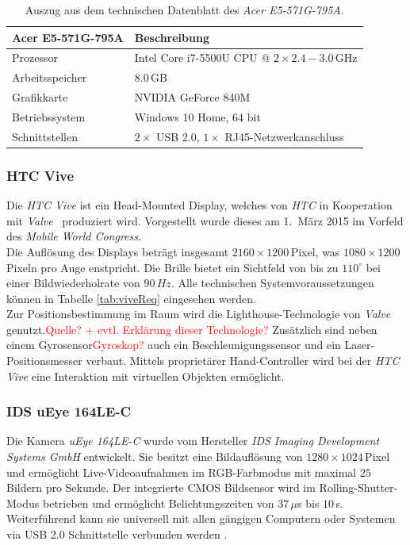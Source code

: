 \begin{table}
	\centering
	\begin{tabular}{|l|l|}
		\hline
		\Absatzbox{}
		\textbf{Acer E5-571G-795A}& \textbf{Beschreibung} \\
		\hline
		Prozessor & Intel Core i7-5500U CPU @ $2\times 2.4-3.0\,$GHz\\
		\hline
		Arbeitsspeicher & $8.0\,$GB \\
		\hline 
		Grafikkarte & NVIDIA GeForce 840M\\
		\hline
		Betriebssystem & Windows 10 Home, 64 bit \\
		\hline
		Schnittstellen & $2\times$ USB 2.0, $1\times$ RJ45-Netzwerkanschluss\\
		\hline
	\end{tabular}
	\caption{Auszug aus dem technischen Datenblatt des \textit{Acer E5-571G-795A}.}
	\label{tab:TrackingCompParam}
\end{table}


\subsubsection{HTC Vive}\label{sec:Vive} 
Die \textit{HTC Vive} ist ein Head-Mounted Display, welches von \textit{HTC} in Kooperation mit \textit{Valve}~\cite{website:Valve} produziert wird. Vorgestellt wurde dieses am 1.\ März 2015 im Vorfeld des \textit{Mobile World Congress}.~\cite{website:mobileworldcongress}\\
Die Auflösung des Displays beträgt insgesamt $2160\times1200$\,Pixel, was $1080\times1200$\,Pixeln pro Auge enstpricht. Die Brille bietet ein Sichtfeld von bis zu $110^\circ$ bei einer Bildwiederholrate von $90\,Hz$.\cite{website:HTC_Vive} Alle technischen Systemvoraussetzungen können in Tabelle \ref{tab:viveReq} eingesehen werden. \\
Zur Positionsbestimmung im Raum wird die Lighthouse-Technologie von \textit{Valve} genutzt.\textcolor{red}{Quelle? + evtl. Erklärung dieser Technologie?} Zusätzlich sind neben einem Gyrosensor\textcolor{red}{Gyroskop?} auch ein Beschleunigungssensor und ein Laser-Positionsmesser verbaut. Mittels proprietärer Hand-Controller wird bei der \emph{HTC Vive} eine Interaktion mit virtuellen Objekten ermöglicht.

\subsubsection{IDS uEye 164LE-C}\label{sec:uEye} 
Die Kamera \textit{uEye 164LE-C} wurde vom Hersteller \textit{IDS Imaging Development Systems GmbH} entwickelt. Sie besitzt eine Bildauflösung von $1280\times1024$\,Pixel und ermöglicht Live-Videoaufnahmen im RGB-Farbmodus mit maximal $25$ Bildern pro Sekunde. Der integrierte CMOS Bildsensor wird im Rolling-Shutter-Modus betrieben und ermöglicht Belichtungszeiten von $37\,\mu$s bis $10$\,s. Weiterführend kann sie universell mit allen gängigen Computern oder Systemen via USB 2.0 Schnittstelle verbunden werden \cite{website:UEyeTechSpec}.

